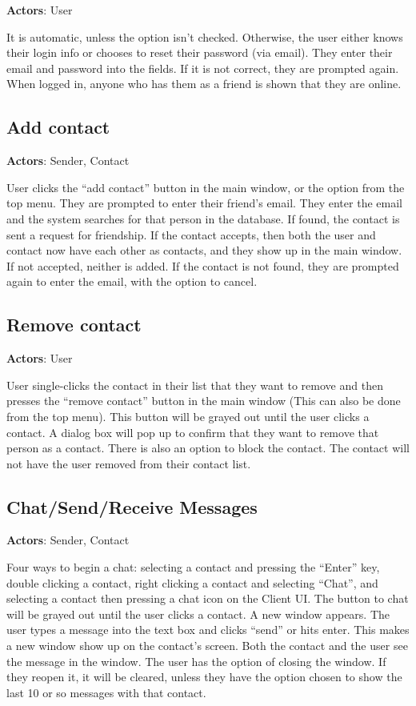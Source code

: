 {\bf Actors}: User

It is automatic, unless the option isn’t checked. Otherwise, the user either knows their login info or chooses to reset their password (via email). They enter their email and password into the fields. If it is not correct, they are prompted again. When logged in, anyone who has them as a friend is shown that they are online.

\subsection{Add contact}

{\bf Actors}: Sender, Contact

User clicks the ``add contact'' button in the main window, or the option from the top menu. They are prompted to enter their friend’s email. They enter the email and the system searches for that person in the database. If found, the contact is sent a request for friendship. If the contact accepts, then both the user and contact now have each other as contacts, and they show up in the main window. If not accepted, neither is added. If the contact is not found, they are prompted again to enter the email, with the option to cancel.

\subsection{Remove contact}

{\bf Actors}: User

User single-clicks the contact in their list that they want to remove and then presses the “remove contact” button in the main window (This can also be done from the top menu). This button will be grayed out until the user clicks a contact. A dialog box will pop up to confirm that they want to remove that person as a contact. There is also an option to block the contact. The contact will not have the user removed from their contact list.

\subsection{Chat/Send/Receive Messages}

{\bf Actors}: Sender, Contact

Four ways to begin a chat: selecting a contact and pressing the ``Enter'' key, double clicking a contact, right clicking a contact and selecting ``Chat'', and selecting a contact then pressing a chat icon on the Client UI. The button to chat will be grayed out until the user clicks a contact.
A new window appears. The user types a message into the text box and clicks ``send'' or hits enter. This makes a new window show up on the contact's screen. Both the contact and the user see the message in the window. The user has the option of closing the window. If they reopen it, it will be cleared, unless they have the option chosen to show the last 10 or so messages with that contact.

